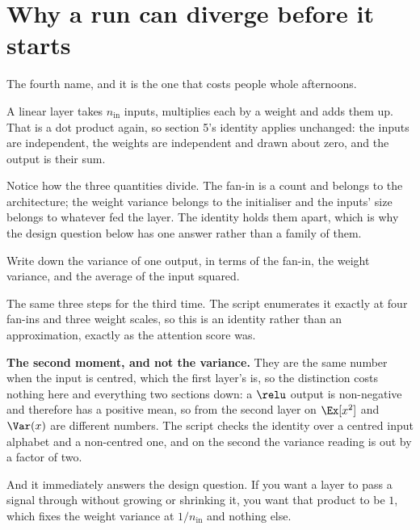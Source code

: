 \section{Why a run can diverge before it starts}
\label{sec:P25-initialisation}

\begin{fr}
The fourth name, and it is the one that costs people whole afternoons.

A linear layer takes $n_{\text{in}}$ inputs, multiplies each by a weight and
adds them up. That is a dot product again, so section 5's identity applies
unchanged: the inputs are independent, the weights are independent and drawn
about zero, and the output is their sum.

Notice how the three quantities divide. The fan-in is a count and belongs to
the architecture; the weight variance belongs to the initialiser and the
inputs' size belongs to whatever fed the layer. The identity holds them apart,
which is why the design question below has one answer rather than a family of
them.

Write down the variance of one output, in terms of the fan-in, the weight
variance, and the average of the input squared.
\dotline
\nextframe
\end{fr}

\begin{fr}

The same three steps for the third time. The script enumerates it exactly at
four fan-ins and three weight scales, so this is an identity rather than an
approximation, exactly as the attention score was.

\begin{note}
\textbf{The second moment, and not the variance.} They are the same number
when the input is centred, which the first layer's is, so the distinction
costs nothing here and everything two sections down: a $\relu$ output is
non-negative and therefore has a positive mean, so from the second layer on
$\Ex[x^{2}]$ and $\Var(x)$ are different numbers. The script checks the
identity over a centred input alphabet and a non-centred one, and on the
second the variance reading is out by a factor of two.
\end{note}

And it immediately answers the design question. If you want a layer to pass a
signal through without growing or shrinking it, you want that product to be
$1$, which fixes the weight variance at
$1/n_{\text{in}}$ and nothing else.
\end{fr}

